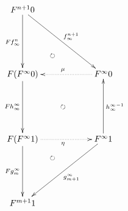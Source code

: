 \documentclass[12pt]{article}
\begin{document}
\pagestyle{empty}

\begin{align*}
  \vcenter{
    \xymatrix@=60pt{
      F^{n + 1} 0
      \ar@{->}[d]_{F f^n_\infty}
      \ar@/_20pt/@{{}{ }{}}[rd]|{\circlearrowright}
      \ar@{->}[rd]^{f^{n + 1}_\infty}
      \\
      F (F^\infty 0)
      \ar@{->}[d]_{F h^\infty_\infty}
      \ar@{{}{ }{}}[rd]|{\circlearrowright}
      &
      F^\infty 0
      \ar@{.>}[l]_{\mu}
      \\
      F (F^\infty 1)
      \ar@{->}[d]_{F g^\infty_m}
      \ar@{.>}[r]_{\eta}
      &
      F^\infty 1
      \ar@{->}[ld]^{g^\infty_{m + 1}}
      \ar@{->}[u]_{{h^\infty_\infty}^{-1}}
      \ar@/_20pt/@{{}{ }{}}[ld]|{\circlearrowright}
      \\
      F^{m + 1} 1
    }
  }
\end{align*}
\end{document}
